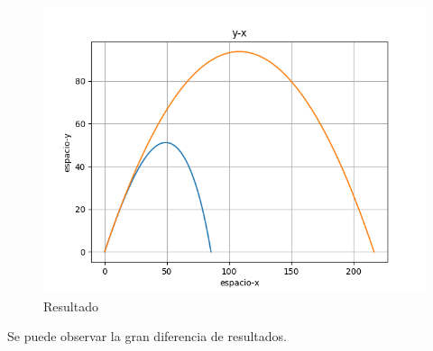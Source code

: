 \documentclass{article}
\begin{document}
\begin{figure}[H]
    \centering
    \includegraphics[width=1\textwidth]{2_1.png}
    \caption{Resultado}
\end{figure}
Se puede observar la gran diferencia de resultados.
\end{document}
